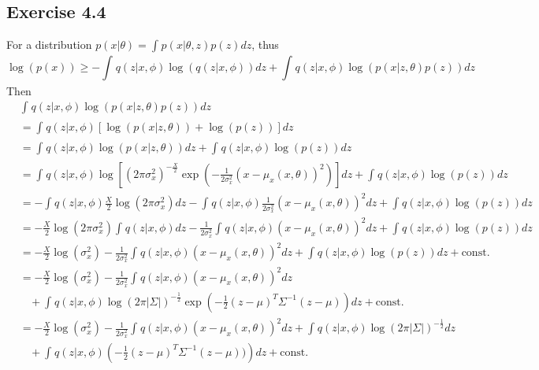 \documentclass[fleqn]{article}
\begin{document}
\subsection*{Exercise 4.4}
For a distribution $p(x|\theta) = \int_{}^{} p(x|\theta,z)p(z) dz$, thus
\begin{equation}
    \log(p(x)) \geq -\int_{}{}q(z|x, \phi)\log(q(z|x, \phi)) dz + \int_{}{}q(z|x, \phi)\log(p(x|z, \theta)p(z)) dz
\end{equation}
Then
\begin{equation}
    \begin{split}
        & \int_{}{}q(z|x, \phi)\log(p(x|z, \theta)p(z))dz \\
        & = \int_{}{}q(z|x, \phi)[\log(p(x|z, \theta)) + \log(p(z))] dz \\
        & = \int_{}{}q(z|x, \phi)\log(p(x|z, \theta))dz + \int_{}{}q(z|x, \phi)\log(p(z))dz \\
        & = \int_{}{}q(z|x, \phi)\log\left[\left(2\pi\sigma^{2}_{x}\right)^{-\frac{X}{2}}\exp\left(-\frac{1}{2\sigma^{2}_{x}}(x-\mu_{x}(x, \theta))^{2}\right)\right]dz + \int_{}{}q(z|x, \phi)\log(p(z))dz \\
        & = - \int_{}{}q(z|x, \phi)\frac{X}{2}\log\left(2\pi\sigma_{x}^{2}\right)dz - \int_{}{}q(z|x, \phi)\frac{1}{2\sigma^{2}_{x}}(x-\mu_{x}(x, \theta))^{2}dz + \int_{}{}q(z|x, \phi)\log(p(z))dz \\
        & = - \frac{X}{2}\log\left(2\pi\sigma_{x}^{2}\right)\int_{}{}q(z|x, \phi)dz -\frac{1}{2\sigma^{2}_{x}} \int_{}{}q(z|x, \phi)(x-\mu_{x}(x, \theta))^{2}dz + \int_{}{}q(z|x, \phi)\log(p(z))dz \\
        & = -\frac{X}{2}\log(\sigma_{x}^{2}) -\frac{1}{2\sigma^{2}_{x}} \int_{}{}q(z|x, \phi)(x-\mu_{x}(x, \theta))^{2}dz + \int_{}{}q(z|x, \phi)\log(p(z))dz + \mathrm{const.} \\
        & = -\frac{X}{2}\log\left(\sigma_{x}^{2}\right) -\frac{1}{2\sigma^{2}_{x}} \int_{}{}q(z|x, \phi)(x-\mu_{x}(x, \theta))^{2}dz \\ & \ \ \ \ +
        \int_{}{}q(z|x, \phi)\log(2\pi|\Sigma|)^{-\frac{1}{2}}\exp\left(-\frac{1}{2}(z-\mu)^{T}\Sigma^{-1}(z-\mu)\right)dz + \mathrm{const.} \\
        & = -\frac{X}{2}\log\left(\sigma_{x}^{2}\right) -\frac{1}{2\sigma^{2}_{x}} \int_{}{}q(z|x, \phi)(x-\mu_{x}(x, \theta))^{2}dz + \int_{}{}q(z|x, \phi)\log(2\pi|\Sigma|)^{-\frac{1}{2}}dz \\ & \ \ \ \ + \int_{}{}q(z|x, \phi) \left(-\frac{1}{2}(z-\mu)^{T}\Sigma^{-1}(z-\mu))\right)dz + \mathrm{const.} \\
    \end{split}
\end{equation}
\end{document}
